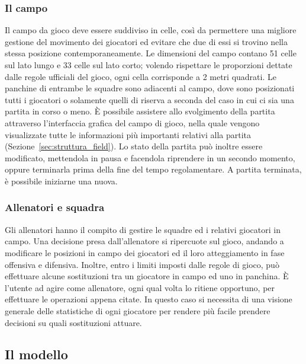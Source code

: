 \subsubsection{Il campo}
\label{sec:analisi_campo}

Il campo da gioco deve essere suddiviso in celle, così da permettere una migliore gestione del movimento dei giocatori ed evitare che due di essi si trovino nella stessa posizione contemporaneamente. Le dimensioni del campo contano 51 celle sul lato lungo e 33 celle sul lato corto; volendo rispettare le proporzioni dettate dalle regole ufficiali del gioco, ogni cella corrisponde a 2 metri quadrati. Le panchine di entrambe le squadre sono adiacenti al campo, dove sono posizionati tutti i giocatori o solamente quelli di riserva a seconda del caso in cui ci sia una partita in corso o meno. È possibile assistere allo svolgimento della partita attraverso l'interfaccia grafica del campo di gioco, nella quale vengono visualizzate tutte le informazioni più importanti relativi alla partita (Sezione~\ref{sec:struttura_field}). Lo stato della partita può inoltre essere modificato, mettendola in pausa e facendola riprendere in un secondo momento, oppure terminarla prima della fine del tempo regolamentare. A partita terminata, è possibile iniziarne una nuova.\\

\subsubsection{Allenatori e squadra}
\label{sec:analisi_allenatori}

Gli allenatori hanno il compito di gestire le squadre ed i relativi giocatori in campo. Una decisione presa dall'allenatore si ripercuote sul gioco, andando a modificare le posizioni in campo dei giocatori ed il loro atteggiamento in fase offensiva e difensiva. Inoltre, entro i limiti imposti dalle regole di gioco, può effettuare alcune sostituzioni tra un giocatore in campo ed uno in panchina. È l'utente ad agire come allenatore, ogni qual volta lo ritiene opportuno, per effettuare le operazioni appena citate. In questo caso si necessita di una visione generale delle statistiche di ogni giocatore per rendere più facile prendere decisioni su quali sostituzioni attuare.

\subsection{Il modello}
\label{sec:entita_coinvolte}

